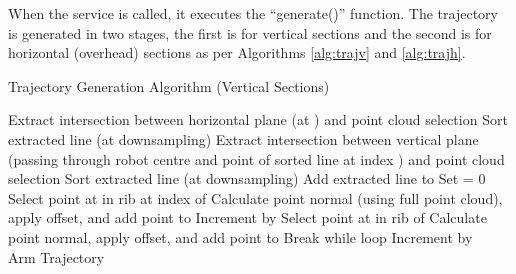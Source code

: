 When the service is called, it executes the ``generate()'' function. The trajectory is generated in two stages, the first is for vertical sections and the second is for horizontal (overhead) sections as per Algorithms \ref{alg:trajv} and \ref{alg:trajh}.
\begin{algorithm}[H]
\caption{Trajectory Generation Algorithm (Vertical Sections)}
\label{alg:trajv}
\begin{algorithmic}[1]
\begin{raggedright}
\State Extract intersection between horizontal plane (at ) and point cloud selection
\State Sort extracted line (at  downsampling)
\State Extract intersection between vertical plane (passing through robot centre and point of sorted line at index ) and point cloud selection
\State Sort extracted line (at  downsampling)
\State Add extracted line to 
\EndFor
\State Set  = 0
\State Select point at  in rib at index  of 
\State Calculate point normal (using full point cloud), apply offset, and add point to 
\EndFor
\State Increment  by 
\State Select point at  in rib  of 
\State Calculate point normal, apply offset, and add point to 
\EndFor
{}
\State Break while loop
\EndIf
\State Increment  by 
\EndWhile
\EndFunction\\
\Return Arm Trajectory
\end{raggedright}
\end{algorithmic}
\end{algorithm}
